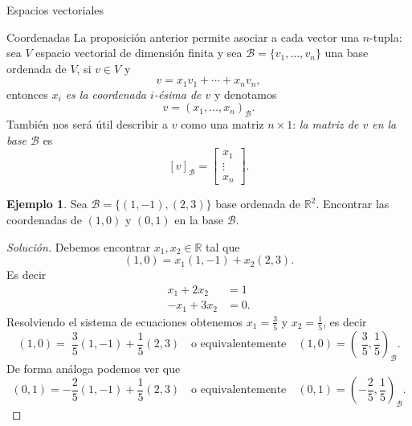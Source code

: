 \documentclass[a4paper,12pt,twoside,spanish,reqno]{amsbook}
\theoremstyle{definition}
\newtheorem{ejemplo}{Ejemplo}[section]
\theoremstyle{remark}
\newcommand{\R}{\mathbb R}
\begin{document}
\begin{chapter}{Espacios vectoriales}
\begin{section}{Coordenadas}
    La proposición anterior permite asociar a cada vector una $n$-tupla: sea $V$  espacio vectorial de dimensión finita y sea $\mathcal{B} = \{v_1,\ldots,v_n\}$ una base ordenada de $V$, si $v \in V$ y $$v =   x_1v_1 + \cdots +x_nv_n,$$  entonces \textit{$x_i$ es la coordenada $i$-ésima de $v$} y denotamos
    $$
    v = (x_1,\ldots,x_n)_{\mathcal B}.
    $$
    También nos será útil describir a $v$ como una matriz $n \times 1$: \textit{la matriz de $v$  en la base  $\mathcal{B}$}  es
    $$
    [v]_\mathcal{B} = \begin{bmatrix}x_1 \\ \vdots \\ x_n\end{bmatrix}.
    $$
    
    \begin{ejemplo}
        Sea $\mathcal B = \{(1,-1),(2,3)\}$ base ordenada de $\R^2$. Encontrar las coordenadas  de $(1,0)$ y $(0,1)$ en la base $\mathcal B$.
    \end{ejemplo}
    \begin{proof}[Solución] Debemos encontrar $x_1, x_2 \in \R$ tal que 
        $$
        (1,0) = x_1(1,-1)+ x_2(2,3).
        $$
        Es decir 
        \begin{align*}
            x_1+ 2x_2 &= 1\\
            -x_1 + 3x_2 &= 0.
        \end{align*}
        Resolviendo el sistema de ecuaciones obtenemos $x_1 = \frac35$ y $x_2 = \frac15$,  es decir
        $$
        (1,0) =\; \frac35(1,-1)+ \frac15(2,3)\quad \text{o equivalentemente} \quad (1,0) = (\;\frac35,\frac15)_{\mathcal B}.
        $$ 
        De forma análoga podemos ver que
        $$
        (0,1) = -\frac25(1,-1)+ \frac15(2,3)\quad \text{o equivalentemente} \quad (0,1) = (-\frac25,\frac15)_{\mathcal B}.
        $$
    \end{proof}
    

\end{section}
\end{chapter}
\end{document}
